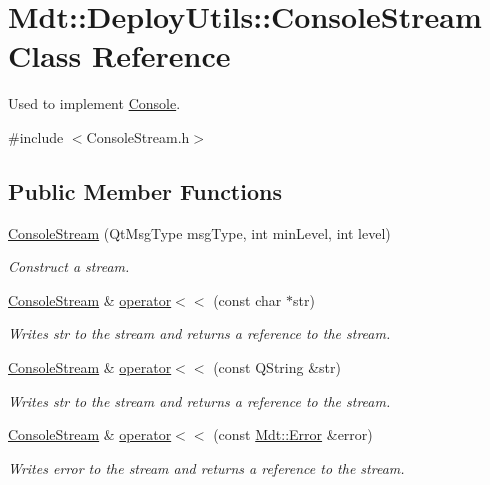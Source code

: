 \hypertarget{class_mdt_1_1_deploy_utils_1_1_console_stream}{}\section{Mdt\+:\+:Deploy\+Utils\+:\+:Console\+Stream Class Reference}
\label{class_mdt_1_1_deploy_utils_1_1_console_stream}


Used to implement \hyperlink{class_mdt_1_1_deploy_utils_1_1_console}{Console}.  




{\ttfamily \#include $<$Console\+Stream.\+h$>$}

\subsection*{Public Member Functions}
\begin{DoxyCompactItemize}
\item 
\hyperlink{class_mdt_1_1_deploy_utils_1_1_console_stream_aa2df420c51b0524d143b4e877293f248}{Console\+Stream} (Qt\+Msg\+Type msg\+Type, int min\+Level, int level)
\begin{DoxyCompactList}\small\item\em Construct a stream. \end{DoxyCompactList}\item 
\hyperlink{class_mdt_1_1_deploy_utils_1_1_console_stream}{Console\+Stream} \& \hyperlink{class_mdt_1_1_deploy_utils_1_1_console_stream_a9fd2ecfe4311b0cdd3b9536f24314af7}{operator$<$$<$} (const char $\ast$str)
\begin{DoxyCompactList}\small\item\em Writes {\itshape str} to the stream and returns a reference to the stream. \end{DoxyCompactList}\item 
\hyperlink{class_mdt_1_1_deploy_utils_1_1_console_stream}{Console\+Stream} \& \hyperlink{class_mdt_1_1_deploy_utils_1_1_console_stream_aebf5221a69df6dfb11c0a0c666e00653}{operator$<$$<$} (const Q\+String \&str)
\begin{DoxyCompactList}\small\item\em Writes {\itshape str} to the stream and returns a reference to the stream. \end{DoxyCompactList}\item 
\hyperlink{class_mdt_1_1_deploy_utils_1_1_console_stream}{Console\+Stream} \& \hyperlink{class_mdt_1_1_deploy_utils_1_1_console_stream_ae8b85dd69639169c3e60002a42f38236}{operator$<$$<$} (const \hyperlink{class_mdt_1_1_error}{Mdt\+::\+Error} \&error)
\begin{DoxyCompactList}\small\item\em Writes {\itshape error} to the stream and returns a reference to the stream. \end{DoxyCompactList}\end{DoxyCompactItemize}


